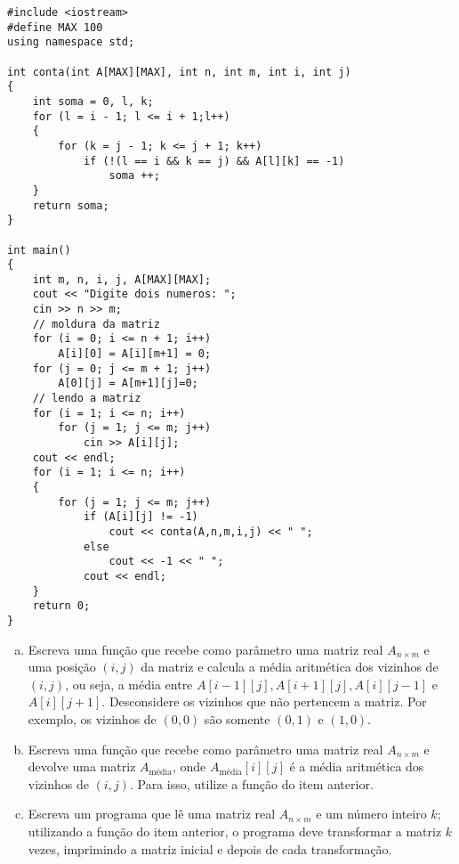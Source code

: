 \documentclass[a4paper]{memoir}
\begin{document}
\begin{sol}
\begin{lstlisting}
#include <iostream>
#define MAX 100
using namespace std;

int conta(int A[MAX][MAX], int n, int m, int i, int j)
{
    int soma = 0, l, k;
    for (l = i - 1; l <= i + 1;l++)
    {
        for (k = j - 1; k <= j + 1; k++)
            if (!(l == i && k == j) && A[l][k] == -1)
                soma ++;
    }
    return soma;
}

int main()
{
    int m, n, i, j, A[MAX][MAX];
    cout << "Digite dois numeros: ";
    cin >> n >> m;
    // moldura da matriz
    for (i = 0; i <= n + 1; i++)
        A[i][0] = A[i][m+1] = 0;
    for (j = 0; j <= m + 1; j++)
        A[0][j] = A[m+1][j]=0;
    // lendo a matriz
    for (i = 1; i <= n; i++)
        for (j = 1; j <= m; j++)
            cin >> A[i][j];
    cout << endl;
    for (i = 1; i <= n; i++)
    {
        for (j = 1; j <= m; j++)
            if (A[i][j] != -1)
                cout << conta(A,n,m,i,j) << " ";
            else
                cout << -1 << " ";
            cout << endl;
    }
    return 0;
}
\end{lstlisting}
\end{sol}

\begin{prob}\label{prob310.cpp}
\begin{enumerate}[a)]
 \item Escreva uma função que recebe como parâmetro uma matriz real $A_{n \times m}$ e uma posição $(i,j)$ da matriz e calcula a média aritmética dos vizinhos de $(i,j)$, ou seja, a média entre $A[i-1][j], A[i+1][j], A[i][j-1]$ e $A[i][j+1]$. Desconsidere os vizinhos que não pertencem a matriz. Por exemplo, os vizinhos de $(0,0)$ são somente $(0,1)$ e $(1,0)$.
 \item Escreva uma função que recebe como parâmetro uma matriz real $A_{n \times m}$ e devolve uma matriz $A_\text{m\'edia}$, onde $A_\text{m\'edia} [i][j]$ é a média aritmética dos vizinhos de $(i,j)$. Para isso, utilize a função do item anterior.
 \item Escreva um programa que lê uma matriz real $A_{n \times m}$ e um número inteiro $k$; utilizando a função do item anterior, o programa deve transformar a matriz $k$ vezes, imprimindo a matriz inicial e depois de cada transformação.
\end{enumerate}
\end{prob}
\end{document}
